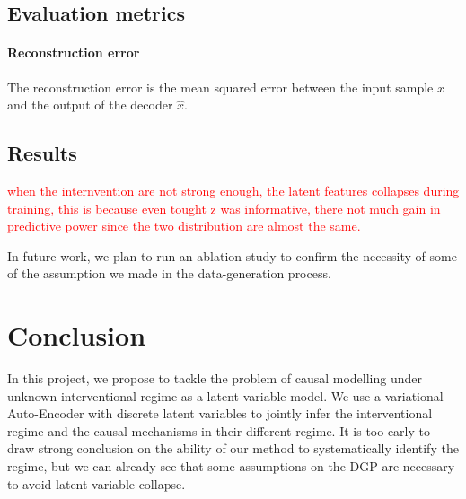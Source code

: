 \documentclass{article}
\newcommand\todo[1]{\textcolor{red}{#1}}
\begin{document}
\subsection{Evaluation metrics}

\paragraph{Reconstruction error} The reconstruction error is the mean squared error between the input sample $x$
and the output of the decoder $\hat{x}$.

\subsection{Results}

\todo{when the internvention are not strong enough, the latent features collapses during training, this is because even tought z was informative, there not much gain in predictive power since the two distribution are almost the same.}

In future work, we plan to run an ablation study to confirm the necessity of
some of the assumption we made in the data-generation process.

\section{Conclusion}\label{subsec:Conclusion}

In this project, we propose to tackle the problem of causal modelling under
unknown interventional regime as a latent variable model. We use a variational
Auto-Encoder with discrete latent variables to jointly infer the interventional
regime and the causal mechanisms in their different regime. It is too early to
draw strong conclusion on the ability of our method to systematically identify
the regime, but we can already see that some assumptions on the DGP are
necessary to avoid latent variable collapse.



\end{document}
